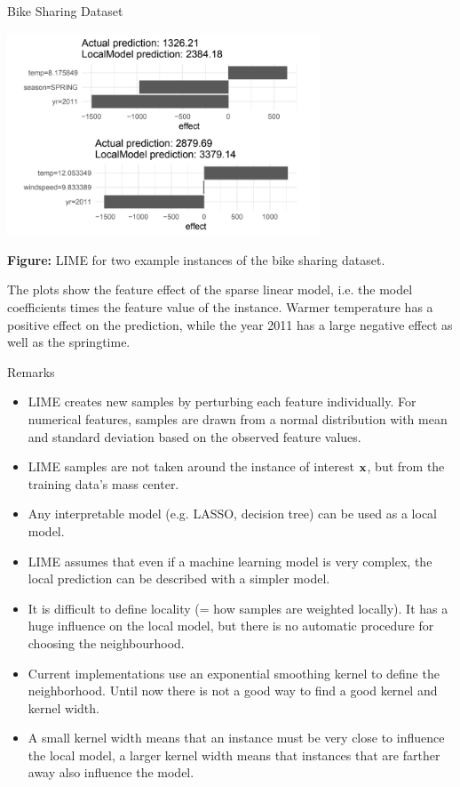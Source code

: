 \documentclass[11pt,compress,t,notes=noshow, xcolor=table]{beamer}
\begin{document}
\begin{vbframe}{Bike Sharing Dataset}
\vspace{-.3cm}

\begin{center}
\includegraphics[width=0.7\textwidth]{figure/bike-figure.png}
\end{center} 

\footnotesize \textbf{Figure:} LIME for two example instances of the bike sharing dataset.

\normalsize
\vspace{0.2cm}
The plots show the feature effect of the sparse linear model, i.e. the model coefficients times the feature value of the instance.
Warmer temperature has a positive effect on the prediction, 
while the year 2011 has a large negative effect as well as the springtime.
\end{vbframe}

\begin{vbframe}{Remarks}
  \begin{itemize}
      \item LIME creates new samples by perturbing each feature individually. For numerical features, samples are drawn from a normal distribution with mean and standard deviation based on the observed feature values.   
      \item LIME samples are not taken around the instance of interest $\xv$, but from the training data's mass center.
      \item Any interpretable model (e.g. LASSO, decision tree) can be used as a local model. 
      \item LIME assumes that even if a machine learning model is very complex, the local prediction can be described with a simpler model.
     \item It is difficult to define locality (= how samples are weighted locally). It has a huge influence on the local model, but there is no automatic procedure for choosing the neighbourhood. 
     \item Current implementations use an exponential smoothing kernel to define the neighborhood. 
     Until now there is not a good way to find a good kernel and kernel width. 
     \item A small kernel width means that an instance must be very close to influence the local model, a larger kernel width means that instances that are farther away also influence the model. 
   \end{itemize}
\end{vbframe}
\end{document}
